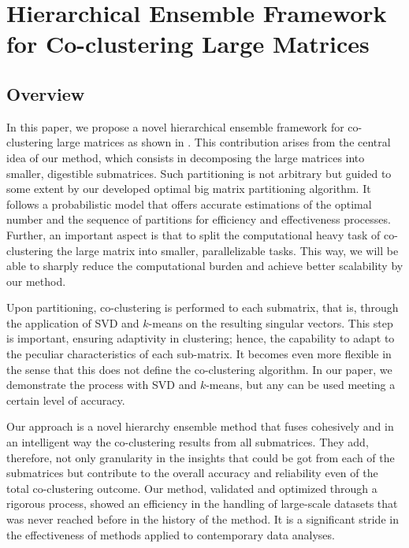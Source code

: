
\section{Hierarchical Ensemble Framework for Co-clustering Large Matrices}
\label{sec:method}

\subsection{Overview}

In this paper, we propose a novel hierarchical ensemble framework for co-clustering large matrices as shown in . 
This contribution arises from the central idea of our method, which consists in decomposing the large matrices into smaller, digestible submatrices. Such partitioning is not arbitrary but guided to some extent by our developed optimal big matrix partitioning algorithm. It follows a probabilistic model that offers accurate estimations of the optimal number and the sequence of partitions for efficiency and effectiveness processes. Further, an important aspect is that to split the computational heavy task of co-clustering the large matrix into smaller, parallelizable tasks. This way, we will be able to sharply reduce the computational burden and achieve better scalability by our method.

Upon partitioning, co-clustering is performed to each submatrix, that is, through the application of SVD and $k$-means on the resulting singular vectors. This step is important, ensuring adaptivity in clustering; hence, the capability to adapt to the peculiar characteristics of each sub-matrix. It becomes even more flexible in the sense that this does not define the co-clustering algorithm. In our paper, we demonstrate the process with SVD and $k$-means, but any can be used meeting a certain level of accuracy.

Our approach is a novel hierarchy ensemble method that fuses cohesively and in an intelligent way the co-clustering results from all submatrices. They add, therefore, not only granularity in the insights that could be got from each of the submatrices but contribute to the overall accuracy and reliability even of the total co-clustering outcome. Our method, validated and optimized through a rigorous process, showed an efficiency in the handling of large-scale datasets that was never reached before in the history of the method. It is a significant stride in the effectiveness of methods applied to contemporary data analyses.

